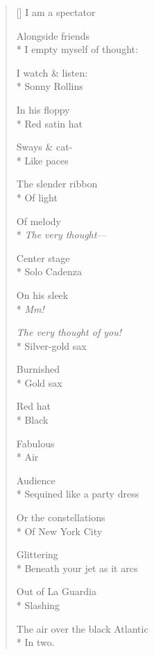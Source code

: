 \label{ch:as_you_leave}
\settowidth{\versewidth}{The air over the black Atlantic}
\begin{verse}[\versewidth]
I am a spectator

Alongside friends\\*
I empty myself of thought:

I watch \& listen:\\*
Sonny Rollins

In his floppy\\*
Red satin hat

Sways \& cat-\\*
Like paces

The slender ribbon\\*
Of light

Of melody\\*
\textit{The very thought}---

Center stage\\*
Solo Cadenza

On his sleek\\*
\textit{Mm!}

\textit{The very thought of you!}\\*
Silver-gold sax

Burnished\\*
Gold sax

Red hat\\*
Black

Fabulous\\*
Air

Audience\\*
Sequined like a party dress

Or the constellations\\*
Of New York City

Glittering\\*
Beneath your jet as it arcs

Out of La Guardia\\*
Slashing

The air over the black Atlantic\\*
In two.
\end{verse}
